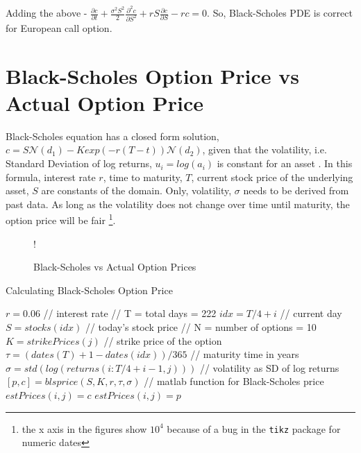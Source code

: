 \documentclass[11pt, fleqn]{article}
\begin{document}
Adding the above - $\frac{\partial c}{\partial t} + \frac{\sigma^2S^2}{2}\frac{\partial^2 c}{\partial S^2} + rS\frac{\partial c}{\partial S} - rc = 0$. So, Black-Scholes PDE is correct for European call option.

\section{Black-Scholes Option Price vs Actual Option Price}

Black-Scholes equation has a closed form solution, $c = S\mathcal{N}(d_1) - Kexp(-r(T-t))\mathcal{N}(d_2)$, given that the volatility, i.e. Standard Deviation of log returns, $u_i = log(a_i)$ is constant for an asset \cite{hull}. In this formula, interest rate $r$, time to maturity, $T$, current stock price of the underlying asset, $S$ are constants of the domain. Only, volatility, $\sigma$ needs to be derived from past data. As long as the volatility does not change over time until maturity, the option price will be fair \footnote{the x axis in the figures show $10^4$ because of a bug in the \texttt{tikz} package for numeric dates}.

\begin{figure}[!h]
\begin{center}
	\resizebox {0.6\textwidth} {!} { }
	\caption{Black-Scholes vs Actual Option Prices}
	\label{fig:q2-prices}
	\vspace{-0.8cm}
\end{center}
\end{figure}

\vspace{-0.3cm}

\begin{algorithm}[H]
\caption{Calculating Black-Scholes Option Price}
\label{alg:black-sholes}
\begin{algorithmic}
\State $r = 0.06$ // interest rate
 // T = total days = 222
\State $idx = T/4 + i$ // current day
\State $S = stocks(idx)$ // today's stock price
 // N = number of options = 10
\State $K = strikePrices(j)$ // strike price of the option
\State $\tau = (dates(T)+1 - dates(idx))/365$ // maturity time in years
\State $\sigma = std(log(returns(i:T/4+i-1, j)))$ // volatility as SD of log returns
\State $[p, c] = blsprice(S, K, r, \tau, \sigma)$ // matlab function for Black-Scholes price
\State $estPrices(i,j) = c$
\Else
\State $estPrices(i,j) = p$
\EndIf
\EndFor
\EndFor
\end{algorithmic}
\end{algorithm}
\end{document}
